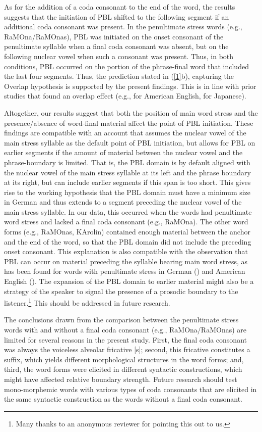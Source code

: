 \documentclass[output=paper]{langscibook}
\begin{document}
As for the addition of a coda consonant to the end of the word, the results suggests that the initiation of PBL shifted to the following segment if an additional coda consonant was present. In the penultimate stress words (e.g., RaMOna\slash RaMOnas), PBL was initiated on the onset consonant of the penultimate syllable when a final coda consonant was absent, but on the following nuclear vowel when such a consonant was present. Thus, in both conditions, PBL occurred on the portion of the phrase-final word that included the last four segments. Thus, the prediction stated in (\ref{1}b), capturing the Overlap hypothesis is supported by the present findings. This is in line with prior studies that found an overlap effect (e.g., \citealt{ByrdSaltzman2003} for American English, \citealt{SeoEtal2019} for Japanese).

Altogether, our results suggest that both the position of main word stress and the presence\slash absence of word-final material affect the point of PBL initiation. These findings are compatible with an account that assumes the nuclear vowel of the main stress syllable as the default point of PBL initiation, but allows for PBL on earlier segments if the amount of material between the nuclear vowel and the phrase-boundary is limited. That is, the PBL domain is by default aligned with the nuclear vowel of the main stress syllable at its left and the phrase boundary at its right, but can include earlier segments if this span is too short. This gives rise to the working hypothesis that the PBL domain must have a minimum size in German and thus extends to a segment preceding the nuclear vowel of the main stress syllable. In our data, this occurred when the words had penultimate word stress and lacked a final coda consonant (e.g., RaMOna). The other word forms (e.g., RaMOnas, KArolin) contained enough material between the anchor and the end of the word, so that the PBL domain did not include the preceding onset consonant. This explanation is also compatible with the observation that PBL can occur on material preceding the syllable bearing main word stress, as has been found for words with penultimate stress in German (\citealt{Silverman1990}) and American English (\citealt{ChoEtal2013}). The expansion of the PBL domain to earlier material might also be a strategy of the speaker to signal the presence of a prosodic boundary to the listener.\footnote{Many thanks to an anonymous reviewer for pointing this out to us.} This should be addressed in future research.

The conclusions drawn from the comparison between the penultimate stress words with and without a final coda consonant (e.g., RaMOna\slash RaMOnas) are limited for several reasons in the present study. First, the final coda consonant was always the voiceless alveolar fricative [s]; second, this fricative constitutes a suffix, which yields different morphological structures in the word forms; and, third, the word forms were elicited in different syntactic constructions, which might have affected relative boundary strength. Future research should test mono-mor\-phem\-ic words with various types of coda consonants that are elicited in the same syntactic construction as the words without a final coda consonant.
\end{document}
